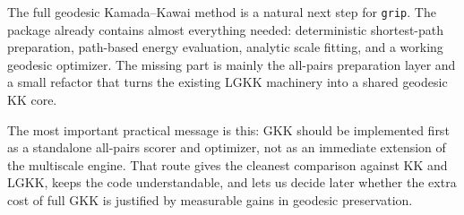 \documentclass[11pt]{article}
\begin{document}
The full geodesic Kamada--Kawai method is a natural next step for
\texttt{grip}. The package already contains almost everything needed:
deterministic shortest-path preparation, path-based energy evaluation, analytic
scale fitting, and a working geodesic optimizer. The missing part is mainly the
all-pairs preparation layer and a small refactor that turns the existing LGKK
machinery into a shared geodesic KK core.

The most important practical message is this: GKK should be implemented first as
a standalone all-pairs scorer and optimizer, not as an immediate extension of
the multiscale engine. That route gives the cleanest comparison against KK and
LGKK, keeps the code understandable, and lets us decide later whether the extra
cost of full GKK is justified by measurable gains in geodesic preservation.
\end{document}
